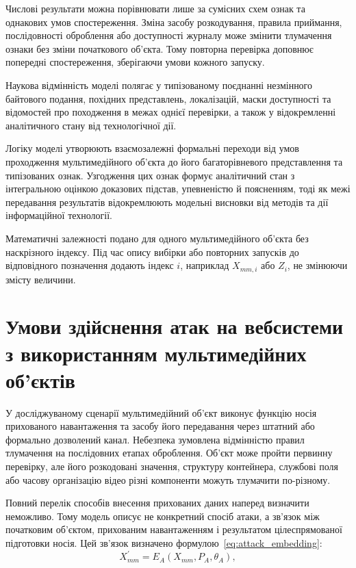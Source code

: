 Числові результати можна порівнювати лише за сумісних схем ознак та однакових умов спостереження. Зміна засобу розкодування, правила приймання, послідовності оброблення або доступності журналу може змінити тлумачення ознаки без зміни початкового об’єкта. Тому повторна перевірка доповнює попередні спостереження, зберігаючи умови кожного запуску.

Наукова відмінність моделі полягає у типізованому поєднанні незмінного байтового подання, похідних представлень, локалізацій, маски доступності та відомостей про походження в межах однієї перевірки, а також у відокремленні аналітичного стану від технологічної дії.

Логіку моделі утворюють взаємозалежні формальні переходи від умов проходження мультимедійного об’єкта до його багаторівневого представлення та типізованих ознак. Узгодження цих ознак формує аналітичний стан з інтегральною оцінкою доказових підстав, упевненістю й поясненням, тоді як межі передавання результатів відокремлюють модельні висновки від методів та дії інформаційної технології.

Математичні залежності подано для одного мультимедійного об’єкта без наскрізного індексу. Під час опису вибірки або повторних запусків до відповідного позначення додають індекс $i$, наприклад $X_{mm,i}$ або $Z_i$, не змінюючи змісту величини.

\section{Умови здійснення атак на вебсистеми з використанням мультимедійних об’єктів}
\label{sec:attack_model}

У досліджуваному сценарії мультимедійний об’єкт виконує функцію носія прихованого навантаження та засобу його передавання через штатний або формально дозволений канал. Небезпека зумовлена відмінністю правил тлумачення на послідовних етапах оброблення. Об’єкт може пройти первинну перевірку, але його розкодовані значення, структуру контейнера, службові поля або часову організацію відео різні компоненти можуть тлумачити по-різному.

Повний перелік способів внесення прихованих даних наперед визначити неможливо. Тому модель описує не конкретний спосіб атаки, а зв’язок між початковим об’єктом, прихованим навантаженням і результатом цілеспрямованої підготовки носія. Цей зв’язок визначено формулою~\eqref{eq:attack_embedding}:
\begin{equation}
X_{mm}^{\prime}=E_A(X_{mm},P_A,\theta_A),
\label{eq:attack_embedding}
\end{equation}

